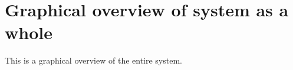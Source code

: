 \chapter{Graphical overview of system as a whole}
\label{ap:systemOverview}

This is a graphical overview of the entire system.